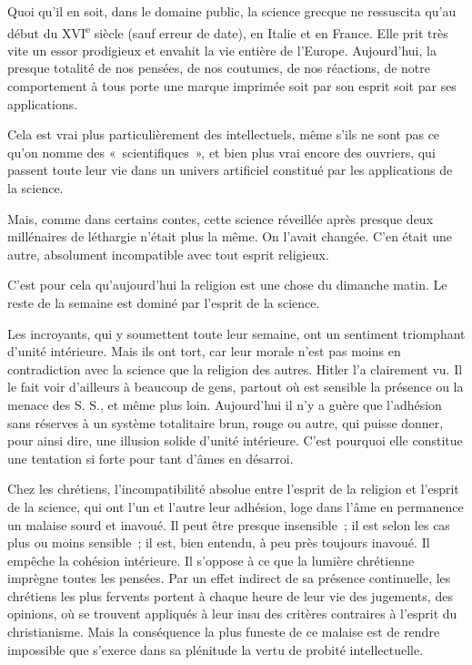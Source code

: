 \documentclass[french,twoside]{book} %
\begin{document}
Quoi qu'il en soit, dans le domaine public, la science grecque ne ressuscita qu'au début du XVI\textsuperscript{e} siècle (sauf erreur de date), en Italie et en France. Elle prit très vite un essor prodigieux et envahit la vie entière de l'Europe. Aujourd'hui, la presque totalité de nos pensées, de nos coutumes, de nos réactions, de notre comportement à tous porte une marque imprimée soit par son esprit soit par ses applications.\par
Cela est vrai plus particulièrement des intellectuels, même s'ils ne sont pas ce qu'on nomme des « scientifiques », et bien plus vrai encore des ouvriers, qui passent toute leur vie dans un univers artificiel constitué par les applications de la science.\par
Mais, comme dans certains contes, cette science réveillée après presque deux millénaires de léthargie n'était plus la même. On l'avait changée. C'en était une autre, absolument incompatible avec tout esprit religieux.\par
C'est pour cela qu'aujourd'hui la religion est une chose du dimanche matin. Le reste de la semaine est dominé par l'esprit de la science.\par
Les incroyants, qui y soumettent toute leur semaine, ont un sentiment triomphant d'unité intérieure. Mais ils ont tort, car leur morale n'est pas moins en contradiction avec la science que la religion des autres. Hitler l'a clairement vu. Il le fait voir d'ailleurs à beaucoup de gens, partout où est sensible la présence ou la menace des S. S., et même plus loin. Aujourd'hui il n'y a guère que l'adhésion sans réserves à un système totalitaire brun, rouge ou autre, qui puisse donner, pour ainsi dire, une illusion solide d'unité intérieure. C'est pourquoi elle constitue une tentation si forte pour tant d'âmes en désarroi.\par
Chez les chrétiens, l'incompatibilité absolue entre l'esprit de la religion et l'esprit de la science, qui ont l'un et l'autre leur adhésion, loge dans l'âme en permanence un malaise sourd et inavoué. Il peut être presque insensible ; il est selon les cas plus ou moins sensible ; il est, bien entendu, à peu près toujours inavoué. Il empêche la cohésion intérieure. Il s'oppose à ce que la lumière chrétienne imprègne toutes les pensées. Par un effet indirect de sa présence continuelle, les chrétiens les plus fervents portent à chaque heure de leur vie des jugements, des opinions, où se trouvent appliqués à leur insu des critères contraires à l'esprit du christianisme. Mais la conséquence la plus funeste de ce malaise est de rendre impossible que s'exerce dans sa plénitude la vertu de probité intellectuelle.\par
\end{document}
